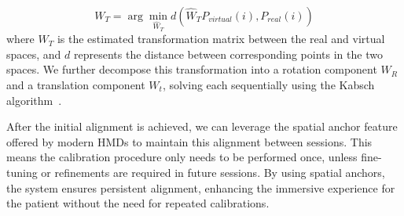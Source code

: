 \begin{equation}
	W_T = \arg\min_{\widehat{W}_T} d\left(\widehat{W}_T P_{virtual}(i), P_{real}(i)\right)
\end{equation}
where $W_T$ is the estimated transformation matrix between the real and virtual spaces, and $d$ represents the distance between corresponding points in the two spaces.  We further decompose this transformation into a rotation component $W_R$ and a translation component $W_t$, solving each sequentially using the Kabsch algorithm~\cite{kabsch1993automatic}.

After the initial alignment is achieved, we can leverage the spatial anchor feature offered by modern HMDs to maintain this alignment between sessions. This means the calibration procedure only needs to be performed once, unless fine-tuning or refinements are required in future sessions. By using spatial anchors, the system ensures persistent alignment, enhancing the immersive experience for the patient without the need for repeated calibrations.
